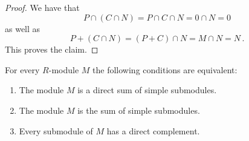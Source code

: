 \begin{proof}
  We have that
  \[
      P \cap (C \cap N)
    = P \cap C \cap N
    = 0 \cap N
    = 0
  \]
  as well as
  \[
      P + (C \cap N)
    = (P + C) \cap N
    = M \cap N
    = N \,.
  \]
  This proves the claim.
\end{proof}




\begin{proposition}
  \label{proposition: characterisation semisimple modules}
  For every $R$-module $M$ the following conditions are equivalent:
  \begin{enumerate}
    \item
      \label{enumerate: direct sum of simple}
      The module $M$ is a direct sum of simple submodules. 
    \item
      \label{enumerate: sum of simple}
      The module $M$ is the sum of simple submodules.
    \item
      \label{enumerate: direct complements}
      Every submodule of $M$ has a direct complement.
  \end{enumerate}
\end{proposition}


